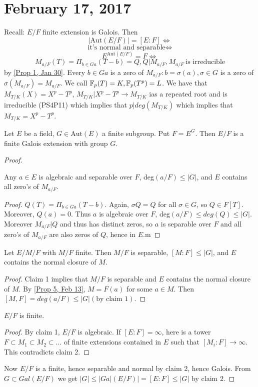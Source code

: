 \section{February 17, 2017}

Recall:
$E/F$ finite extension is Galois. Then $$|\text{Aut}(E/F)|=[E:F]\iff$$
$$\text{it's normal and separable}\iff$$
$$E^{\text{Aut}(E/F)}=F\iff$$
$$M_{a/F}(T)=\Pi_{b\in Ga}(T-b)=Q, Q|M_{a/F},M_{a/F}\ \text{is irreducible}$$ by \ref{Prop 1, Jan 30}.
Every $b\in Ga$ is a zero of $M_{a/F}:b=\sigma(a),\sigma\in G$ is a zero of $\sigma(M_{a/F})=M_{a/F}$. We call $\mathbb{F}_p(T)=K,\mathbb{F}_p(T^p)=L$. We have that $M_{T/K}(X)=X^p-T^p$, $M_{T/K}|X^p-T^p\longrightarrow M_{T/K}$ ias a repeated root and is irreducible (PS4P11) which implies that $p|deg(M_{T/K})$ which implies that $M_{T/K}=X^p-T^p$.

\begin{prop} \label{Prop 1, Feb 17}
Let $E$ be a field, $G\in \text{Aut}(E)$ a finite subgroup. Put $F=E^G$. Then $E/F$ is a finite Galois extension with group $G$.
\end{prop}
\begin{proof}
\begin{claim}
Any $a\in E$ is algebraic and separable over $F$, deg$(a/F)\leq |G|$, and $E$ contains all zero's of $M_{a/F}$.
\end{claim}
\begin{proof}
$Q(T)=\Pi_{b\in Ga}(T-b)$. Again, $\sigma Q=Q$ for all $\sigma\in G$, so $Q\in F[T]$. Moreover, $Q(a)=0$. Thus $a$ is algebraic over $F$, deg$(a/F)\leq deg(Q)\leq |G|$. Moreover $M_{a/F}|Q$ and thus has distinct zeros, so $a$ is separable over $F$ and all zero's of $M_{a/F}$ are also zeros of $Q$, hence in $E$.m
\end{proof}
\begin{claim}
Let $E/M/F$ with $M/F$ finite. Then $M/F$ is separable, $[M:F]\leq |G|$, and $E$ contains the normal closure of $M$.
\end{claim}
\begin{proof}
Claim 1 implies that $M/F$ is separable and $E$ contains the normal closure of $M$. By \ref{Prop 5, Feb 13}, $M=F(a)$ for some $a\in M$. Then $[M,F]=deg(a/F)\leq |G| (\text{by claim 1}).$
\end{proof}
\begin{claim}
$E/F$ is finite.
\end{claim}
\begin{proof}
By claim 1, $E/F$ is algebraic. If $[E:F]=\infty$, here is a tower $F\subset M_1\subset M_2\subset\ldots$ of finite extensions contained in $E$ such that $[M_i:F]\longrightarrow\infty$. This contradicts claim 2.
\end{proof}
Now $E/F$ is a finite, hence separable and normal by claim 2, hence Galois. From $G\subset Gal(E/F)$ we get $|G|\leq |Ga|(E/F)|=[E:F]\leq |G|$ by claim 2.
\end{proof}
